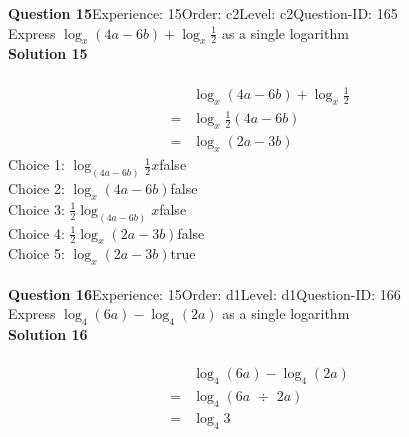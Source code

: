 \documentclass{article}
\begin{document}
\noindent\textbf{Question 15}\hspace{20pt}Experience: 15\hspace{20pt}Order: c2\hspace{20pt}Level: c2\hspace{20pt}Question-ID: 165\\[2pt]
Express $\log_{x}(4a-6b)+\log_{x}\displaystyle\frac{1}{2}$ as a single logarithm\\[4pt]
\noindent\textbf{Solution 15}\\[2pt]
\\[-35pt]\begin{align*}
&\log_{x}(4a-6b)+\log_{x}\displaystyle\frac{1}{2}\\[2pt]
=&\log_{x}\displaystyle\frac{1}{2}(4a-6b)\\[2pt]
=&\log_{x}(2a-3b)
\end{align*}
Choice 1: \hspace{20pt}$\log_{(4a-6b)}\displaystyle\frac{1}{2}x$\hspace{20pt}false\\
Choice 2: \hspace{20pt}$\log_{x}(4a-6b)$\hspace{20pt}false\\
Choice 3: \hspace{20pt}$\displaystyle\frac{1}{2}\log_{(4a-6b)}x$\hspace{20pt}false\\
Choice 4: \hspace{20pt}$\displaystyle\frac{1}{2}\log_{x}(2a-3b)$\hspace{20pt}false\\
Choice 5: \hspace{20pt}$\log_{x}(2a-3b)$\hspace{20pt}true\\
\\[4pt]
\noindent\textbf{Question 16}\hspace{20pt}Experience: 15\hspace{20pt}Order: d1\hspace{20pt}Level: d1\hspace{20pt}Question-ID: 166\\[2pt]
Express $\log_{4}(6a)-\log_{4}(2a)$ as a single logarithm\\[4pt]
\noindent\textbf{Solution 16}\\[2pt]
\\[-35pt]\begin{align*}
&\log_{4}(6a)-\log_{4}(2a)\\[2pt]
=&\log_{4}(6a \,\, \div \,\, 2a)\\[2pt]
=&\log_{4}3
\end{align*}
\end{document}
